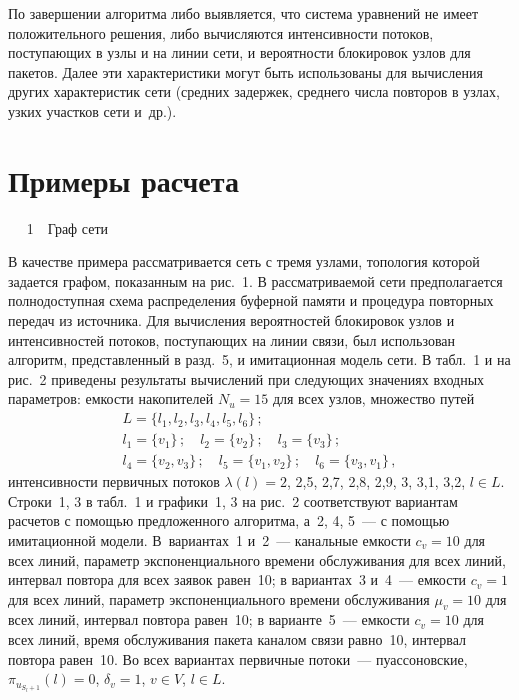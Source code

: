 \begin{multicols}{2}
     По завершении алгоритма либо выявляется, что система уравнений не 
имеет положительного решения, либо вычисляются интенсивности потоков, 
поступающих в узлы и на линии сети, и вероятности блокировок узлов для 
пакетов. Далее эти характеристики могут быть использованы для вычисления 
других характеристик сети (средних задержек, среднего числа повторов в узлах, 
узких участков сети и~др.).


     
\section{Примеры расчета}

\begin{center} %
\vspace*{12pt}
\mbox{%
\epsfxsize=77.538mm
}
\vspace*{4pt}
{{\figurename~1}\ \ \small{Граф сети}}
\end{center}
\vspace*{-6pt}


\bigskip
\addtocounter{figure}{1}

     В качестве примера рассматривается сеть с тремя узлами, топология 
которой задается графом, показанным на рис.~1. В рассматриваемой сети 
предполагается полнодоступная схема распределения буферной памяти и 
процедура повторных передач из источника. Для вычисления вероятностей 
блокировок узлов и интенсивностей потоков, по\-сту\-па\-ющих на линии связи, 
был использован алгоритм, представленный в разд.~5, и имитационная модель 
сети. В табл.~1 и на рис.~2 приведены результаты вычислений при следующих 
значениях входных параметров: емкости накопителей $N_u = 15$ для всех 
узлов, множество путей
     \begin{gather*}
     L = \{l_1, l_2, l_3, l_4, l_5,l_6\}\,;\\
     l_1=\{v_1\}\,;\quad l_2=\{v_2\}\,;\quad 
l_3=\{v_3\}\,;\\
l_4=\{v_2,v_3\}\,;\quad l_5=\{v_1,v_2\}\,;\quad l_6=\{v_3,v_1\}\,,
     \end{gather*}
     интенсивности первичных потоков $\lambda (l) =2$, 2,5, 2,7, 2,8, 2,9, 3, 
3,1, 3,2, $l \in L$.  Строки~1, 3 в табл.~1 и графики~1, 3 на 
рис.~2 соответствуют вариантам расчетов с помощью предложенного 
алгоритма, а~2, 4, 5~--- с помощью имитационной 
модели. В~вариантах~1 и~2~--- канальные емкости $c_v = 10$ для всех линий, 
параметр экспоненциального времени обслуживания   для всех линий, 
интервал повтора для всех заявок равен~10; в вариантах~3 и~4~--- емкости $c_v = 
1$ для всех линий, параметр экспоненциального времени обслуживания $\mu_v 
= 10$ для всех линий, интервал повтора равен~10; в варианте~5~--- ем\-кости $c_v = 
10$ для всех линий, время обслуживания пакета каналом связи равно~10, 
интервал повтора равен~10. Во всех вариантах первичные потоки~--- 
пуассоновские, $\pi_{u_{S_l+1}}(l) =0$, $\delta_v =1$, $v\in V$, $l\in 
L$.

     
\end{multicols}

